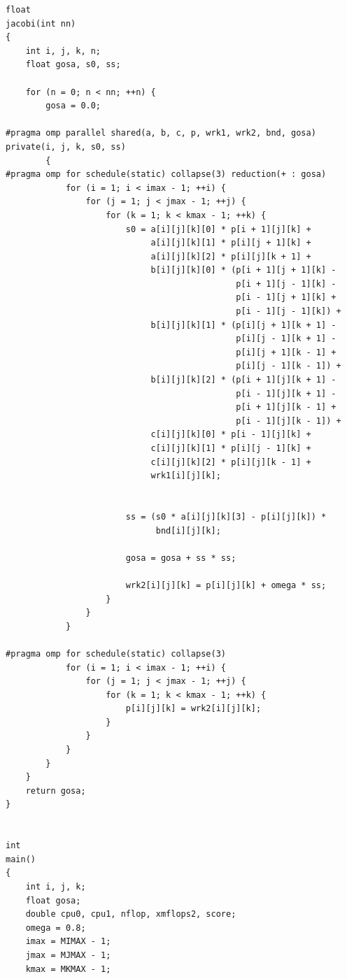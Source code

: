 \documentclass[a4paper, 11pt]{article}
\begin{document}
\begin{lstlisting}
float
jacobi(int nn)
{
    int i, j, k, n;
    float gosa, s0, ss;

    for (n = 0; n < nn; ++n) {
        gosa = 0.0;

#pragma omp parallel shared(a, b, c, p, wrk1, wrk2, bnd, gosa) 
private(i, j, k, s0, ss)
        {
#pragma omp for schedule(static) collapse(3) reduction(+ : gosa)
            for (i = 1; i < imax - 1; ++i) {
                for (j = 1; j < jmax - 1; ++j) {
                    for (k = 1; k < kmax - 1; ++k) {
                        s0 = a[i][j][k][0] * p[i + 1][j][k] +
                             a[i][j][k][1] * p[i][j + 1][k] +
                             a[i][j][k][2] * p[i][j][k + 1] +
                             b[i][j][k][0] * (p[i + 1][j + 1][k] -
                                              p[i + 1][j - 1][k] -
                                              p[i - 1][j + 1][k] +
                                              p[i - 1][j - 1][k]) +
                             b[i][j][k][1] * (p[i][j + 1][k + 1] -
                                              p[i][j - 1][k + 1] -
                                              p[i][j + 1][k - 1] +
                                              p[i][j - 1][k - 1]) +
                             b[i][j][k][2] * (p[i + 1][j][k + 1] -
                                              p[i - 1][j][k + 1] -
                                              p[i + 1][j][k - 1] +
                                              p[i - 1][j][k - 1]) +
                             c[i][j][k][0] * p[i - 1][j][k] +
                             c[i][j][k][1] * p[i][j - 1][k] +
                             c[i][j][k][2] * p[i][j][k - 1] +
                             wrk1[i][j][k];


                        ss = (s0 * a[i][j][k][3] - p[i][j][k]) *
                              bnd[i][j][k];

                        gosa = gosa + ss * ss;

                        wrk2[i][j][k] = p[i][j][k] + omega * ss;
                    }
                }
            }

#pragma omp for schedule(static) collapse(3)
            for (i = 1; i < imax - 1; ++i) {
                for (j = 1; j < jmax - 1; ++j) {
                    for (k = 1; k < kmax - 1; ++k) {
                        p[i][j][k] = wrk2[i][j][k];
                    }
                }
            }
        }
    }
    return gosa;
}


int
main()
{
    int i, j, k;
    float gosa;
    double cpu0, cpu1, nflop, xmflops2, score;
    omega = 0.8;
    imax = MIMAX - 1;
    jmax = MJMAX - 1;
    kmax = MKMAX - 1;


\end{lstlisting}
\end{document}
